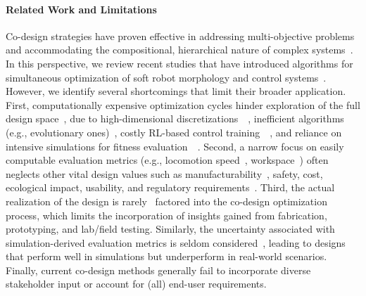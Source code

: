 \paragraph*{Related Work and Limitations}
Co-design strategies have proven effective in addressing multi-objective problems and accommodating the compositional, hierarchical nature of complex systems~\citep{zardini2023co}. 
In this perspective, we review recent studies that have introduced algorithms for simultaneous optimization of soft robot morphology and control systems~\citep{van2018spatial, spielberg2019learning, chen2020design, bhatia2021evolution, spielberg2021co, wang2023preco, medvet2021biodiversity, wang2022curriculum, junge2022leveraging, legrand2023reconfigurable, wang2024diffusebot, navez2024contributions}. 
However, we identify several shortcomings that limit their broader application. 
First, computationally expensive optimization cycles hinder exploration of the full design space~\citep{chen2020design}, due to high-dimensional discretizations~~\citep{spielberg2019learning, medvet2021biodiversity, medvet2022impact, wang2022curriculum, legrand2023reconfigurable, wang2023softzoo, wang2023preco, wang2024diffusebot}, inefficient algorithms (e.g., evolutionary ones)~\citep{chen2020design, rieffel2014growing, hiller2012automatic, bhatia2021evolution, medvet2021biodiversity, medvet2022impact}, costly \gls{RL}-based control training~~\citep{bhatia2021evolution, wang2022curriculum, wang2023softzoo, wang2023preco}, and reliance on intensive simulations for fitness evaluation~~\citep{spielberg2019learning, medvet2021biodiversity, medvet2022impact, wang2022curriculum, legrand2023reconfigurable, wang2023softzoo, wang2023preco, wang2024diffusebot}.
Second, a narrow focus on easily computable evaluation metrics (e.g., locomotion speed~\citep{wang2024diffusebot}, workspace~\citep{guan2023trimmed}) often neglects other vital design values such as manufacturability~\citep{kim2025generative}, safety, cost, ecological impact, usability, and regulatory requirements~\citep{junge2022leveraging}. 
Third, the actual realization of the design is rarely~\citep{junge2022leveraging} factored into the co-design optimization process, which limits the incorporation of insights gained from fabrication, prototyping, and lab/field testing. Similarly, the uncertainty associated with simulation-derived evaluation metrics is seldom considered~\citep{chen2020design}, leading to designs that perform well in simulations but underperform in real-world scenarios.
% 
Finally, current co-design methods generally fail to incorporate diverse stakeholder input or account for (all) end-user requirements.

